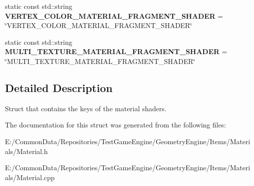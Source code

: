 \begin{DoxyCompactItemize}
\item 
\mbox{\label{struct_geometry_engine_1_1_geometry_material_1_1_material_constants_ab41d4bdc065ffcc53fc552b1e2a70209}} 
static const std\+::string {\bfseries V\+E\+R\+T\+E\+X\+\_\+\+C\+O\+L\+O\+R\+\_\+\+M\+A\+T\+E\+R\+I\+A\+L\+\_\+\+F\+R\+A\+G\+M\+E\+N\+T\+\_\+\+S\+H\+A\+D\+ER} = \char`\"{}V\+E\+R\+T\+E\+X\+\_\+\+C\+O\+L\+O\+R\+\_\+\+M\+A\+T\+E\+R\+I\+A\+L\+\_\+\+F\+R\+A\+G\+M\+E\+N\+T\+\_\+\+S\+H\+A\+D\+ER\char`\"{}
\item 
\mbox{\label{struct_geometry_engine_1_1_geometry_material_1_1_material_constants_ae16d3d3dccfe15e09f212f09630ff0e2}} 
static const std\+::string {\bfseries M\+U\+L\+T\+I\+\_\+\+T\+E\+X\+T\+U\+R\+E\+\_\+\+M\+A\+T\+E\+R\+I\+A\+L\+\_\+\+F\+R\+A\+G\+M\+E\+N\+T\+\_\+\+S\+H\+A\+D\+ER} = \char`\"{}M\+U\+L\+T\+I\+\_\+\+T\+E\+X\+T\+U\+R\+E\+\_\+\+M\+A\+T\+E\+R\+I\+A\+L\+\_\+\+F\+R\+A\+G\+M\+E\+N\+T\+\_\+\+S\+H\+A\+D\+ER\char`\"{}
\end{DoxyCompactItemize}


\subsection{Detailed Description}
Struct that contains the keys of the material shaders. 

The documentation for this struct was generated from the following files\+:\begin{DoxyCompactItemize}
\item 
E\+:/\+Common\+Data/\+Repositories/\+Test\+Game\+Engine/\+Geometry\+Engine/\+Items/\+Materials/Material.\+h\item 
E\+:/\+Common\+Data/\+Repositories/\+Test\+Game\+Engine/\+Geometry\+Engine/\+Items/\+Materials/Material.\+cpp\end{DoxyCompactItemize}
